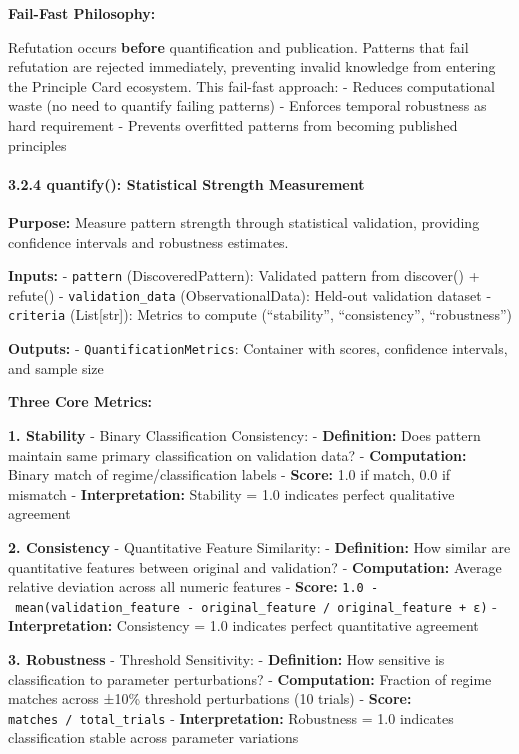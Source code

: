 \documentclass[
]{article}
\begin{document}
\textbf{Fail-Fast Philosophy:}

Refutation occurs \textbf{before} quantification and publication.
Patterns that fail refutation are rejected immediately, preventing
invalid knowledge from entering the Principle Card ecosystem. This
fail-fast approach: - Reduces computational waste (no need to quantify
failing patterns) - Enforces temporal robustness as hard requirement -
Prevents overfitted patterns from becoming published principles

\paragraph{3.2.4 quantify(): Statistical Strength
Measurement}\label{quantify-statistical-strength-measurement}

\textbf{Purpose:} Measure pattern strength through statistical
validation, providing confidence intervals and robustness estimates.

\textbf{Inputs:} - \texttt{pattern} (DiscoveredPattern): Validated
pattern from discover() + refute() - \texttt{validation\_data}
(ObservationalData): Held-out validation dataset - \texttt{criteria}
(List{[}str{]}): Metrics to compute (``stability'', ``consistency'',
``robustness'')

\textbf{Outputs:} - \texttt{QuantificationMetrics}: Container with
scores, confidence intervals, and sample size

\textbf{Three Core Metrics:}

\textbf{1. Stability} - Binary Classification Consistency: -
\textbf{Definition:} Does pattern maintain same primary classification
on validation data? - \textbf{Computation:} Binary match of
regime/classification labels - \textbf{Score:} 1.0 if match, 0.0 if
mismatch - \textbf{Interpretation:} Stability = 1.0 indicates perfect
qualitative agreement

\textbf{2. Consistency} - Quantitative Feature Similarity: -
\textbf{Definition:} How similar are quantitative features between
original and validation? - \textbf{Computation:} Average relative
deviation across all numeric features - \textbf{Score:}
\texttt{1.0\ -\ mean(\textbar{}validation\_feature\ -\ original\_feature\textbar{}\ /\ \textbar{}original\_feature\ +\ ε\textbar{})}
- \textbf{Interpretation:} Consistency = 1.0 indicates perfect
quantitative agreement

\textbf{3. Robustness} - Threshold Sensitivity: - \textbf{Definition:}
How sensitive is classification to parameter perturbations? -
\textbf{Computation:} Fraction of regime matches across ±10\% threshold
perturbations (10 trials) - \textbf{Score:}
\texttt{matches\ /\ total\_trials} - \textbf{Interpretation:} Robustness
= 1.0 indicates classification stable across parameter variations
\end{document}
